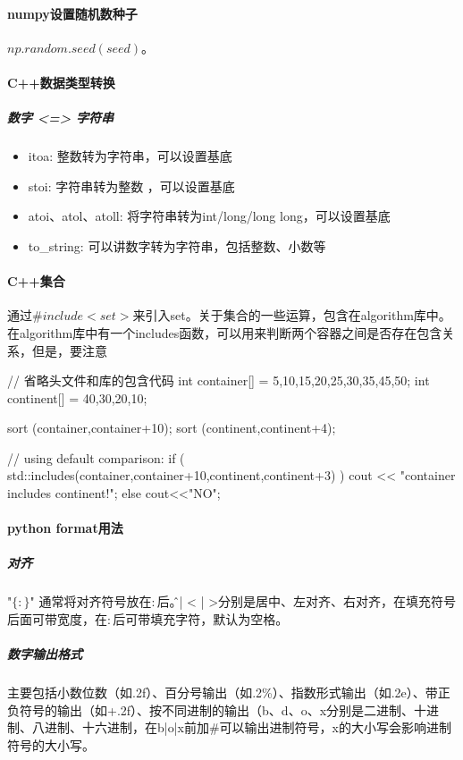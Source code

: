 \paragraph{numpy设置随机数种子}$np.random.seed(seed)$。

\paragraph{C++数据类型转换}
\subparagraph{数字 <=> 字符串}
\begin{itemize}
	\item itoa: 整数转为字符串，可以设置基底
	\item stoi: 字符串转为整数 ，可以设置基底
	\item atoi、atol、atoll: 将字符串转为int/long/long long，可以设置基底
	\item to\_string: 可以讲数字转为字符串，包括整数、小数等
\end{itemize}

\paragraph{C++集合} 通过$\#include<set>$来引入set。关于集合的一些运算，包含在algorithm库中。在algorithm库中有一个includes函数，可以用来判断两个容器之间是否存在包含关系，但是，要注意
\begin{cpp}
	// 省略头文件和库的包含代码
	int container[] = {5,10,15,20,25,30,35,45,50};
	int continent[] = {40,30,20,10};
	
	sort (container,container+10);
	sort (continent,continent+4);
	
	// using default comparison:
	if ( std::includes(container,container+10,continent,continent+3) )
		cout << "container includes continent!\n";
	else	cout<<"NO\n";
	
\end{cpp}


\paragraph{python format用法}
\subparagraph{对齐}"$\{:\}$" 通常将对齐符号放在$:$后。\^ 、| < | >分别是居中、左对齐、右对齐，在填充符号后面可带宽度，在$:$后可带填充字符，默认为空格。

\subparagraph{数字输出格式}主要包括小数位数（如.2f）、百分号输出（如.2\%）、指数形式输出（如.2e）、带正负符号的输出（如+.2f）、按不同进制的输出（b、d、o、x分别是二进制、十进制、八进制、十六进制，在b|o|x前加#可以输出进制符号，x的大小写会影响进制符号的大小写。

